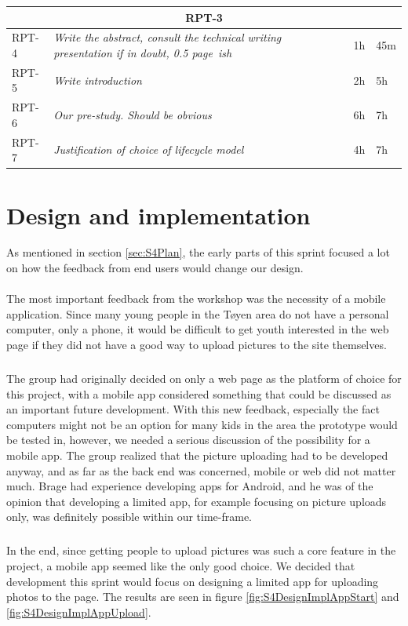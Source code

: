 %
\begin{minipage}{\linewidth}
\setlength{\tabcolsep}{12pt}
\centering
{}
\begin{tabular}{|p{1cm}|p{4cm}|p{2cm}|p{2cm}|}
\hline
\multicolumn{4}{|c|}{\cellcolor{gray!25}RPT-3} \\
\hline
RPT-4 & \it{Write the abstract, consult the technical writing presentation if in doubt, 0.5 page~ish} & 1h & 45m \\
RPT-5 & \it{Write introduction} & 2h & 5h \\
RPT-6 & \it{Our pre-study. Should be obvious} & 6h & 7h \\
RPT-7 & \it{Justification of choice of lifecycle model} & 4h & 7h \\
\hline
\end{tabular}
\end{minipage}

\section{Design and implementation}
\label{sec:S4DesignImpl}

As mentioned in section \ref{sec:S4Plan}, the early parts of this sprint focused a lot on how the feedback from end users would change our design.

\paragraph{} The most important feedback from the workshop was the necessity of a mobile application. Since many young people in the T\o yen area do not have a personal computer, only a phone, it would be difficult to get youth interested in the web page if they did not have a good way to upload pictures to the site themselves.
\subparagraph{} The group had originally decided on only a web page as the platform of choice for this project, with a mobile app considered something that could be discussed as an important future development. With this new feedback, especially the fact computers might not be an option for many kids in the area the prototype would be tested in, however, we needed a serious discussion of the possibility for a mobile app. The group realized that the picture uploading had to be developed anyway, and as far as the back end was concerned, mobile or web did not matter much. Brage had experience developing apps for Android, and he was of the opinion that developing a limited app, for example focusing on picture uploads only, was definitely possible within our time-frame.
\subparagraph{} In the end, since getting people to upload pictures was such a core feature in the project, a mobile app seemed like the only good choice. We decided that development this sprint would focus on designing a limited app for uploading photos to the page. The results are seen in figure \ref{fig:S4DesignImplAppStart} and \ref{fig:S4DesignImplAppUpload}.

